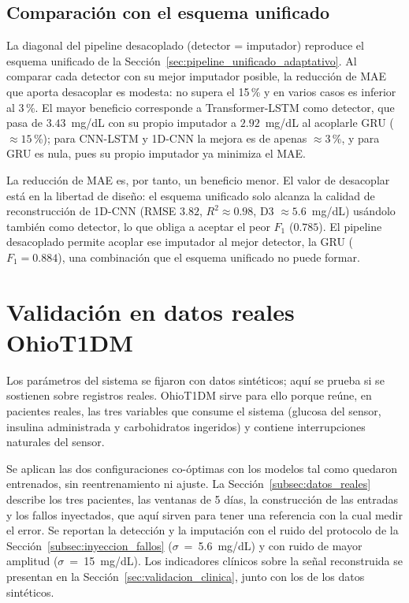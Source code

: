 \documentclass{report}
\begin{document}
\subsection{Comparación con el esquema unificado}
\label{subsec:diagonal-vs-desacoplado}

La diagonal del pipeline desacoplado (detector = imputador) reproduce el esquema unificado de la Sección~\ref{sec:pipeline_unificado_adaptativo}. Al comparar cada detector con su mejor imputador posible, la reducción de MAE que aporta desacoplar es modesta: no supera el 15\,\% y en varios casos es inferior al 3\,\%. El mayor beneficio corresponde a Transformer-LSTM como detector, que pasa de $3.43$~mg/dL con su propio imputador a $2.92$~mg/dL al acoplarle GRU ($\approx 15$\,\%); para CNN-LSTM y 1D-CNN la mejora es de apenas $\approx 3$\,\%, y para GRU es nula, pues su propio imputador ya minimiza el MAE.

La reducción de MAE es, por tanto, un beneficio menor. El valor de desacoplar está en la libertad de diseño: el esquema unificado solo alcanza la calidad de reconstrucción de 1D-CNN (RMSE $3.82$, $R^2 \approx 0.98$, D3 $\approx 5.6$~mg/dL) usándolo también como detector, lo que obliga a aceptar el peor $F_1$ ($0.785$). El pipeline desacoplado permite acoplar ese imputador al mejor detector, la GRU ($F_1 = 0.884$), una combinación que el esquema unificado no puede formar.

\section{Validación en datos reales OhioT1DM}
\label{sec:validacion_ohio}
 
Los parámetros del sistema se fijaron con datos sintéticos; aquí se prueba si se sostienen sobre registros reales. OhioT1DM sirve para ello porque reúne, en pacientes reales, las tres variables que consume el sistema (glucosa del sensor, insulina administrada y carbohidratos ingeridos) y contiene interrupciones naturales del sensor.
 
Se aplican las dos configuraciones co-óptimas con los modelos tal como quedaron entrenados, sin reentrenamiento ni ajuste. La Sección~\ref{subsec:datos_reales} describe los tres pacientes, las ventanas de 5 días, la construcción de las entradas y los fallos inyectados, que aquí sirven para tener una referencia con la cual medir el error. Se reportan la detección y la imputación con el ruido del protocolo de la Sección~\ref{subsec:inyeccion_fallos} ($\sigma$~=~5.6~mg/dL) y con ruido de mayor amplitud ($\sigma$~=~15~mg/dL). Los indicadores clínicos sobre la señal reconstruida se presentan en la Sección~\ref{sec:validacion_clinica}, junto con los de los datos sintéticos.
\end{document}
